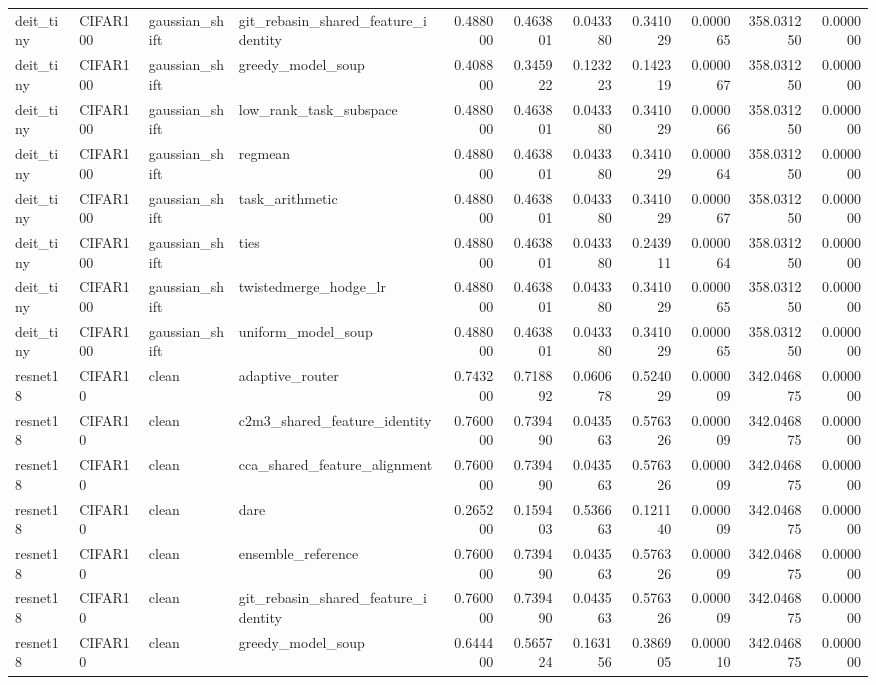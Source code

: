 \begin{tabular}{llllrrrrrrr}
deit_tiny & CIFAR100 & gaussian_shift & git_rebasin_shared_feature_identity & 0.488000 & 0.463801 & 0.043380 & 0.341029 & 0.000065 & 358.031250 & 0.000000 \\
deit_tiny & CIFAR100 & gaussian_shift & greedy_model_soup & 0.408800 & 0.345922 & 0.123223 & 0.142319 & 0.000067 & 358.031250 & 0.000000 \\
deit_tiny & CIFAR100 & gaussian_shift & low_rank_task_subspace & 0.488000 & 0.463801 & 0.043380 & 0.341029 & 0.000066 & 358.031250 & 0.000000 \\
deit_tiny & CIFAR100 & gaussian_shift & regmean & 0.488000 & 0.463801 & 0.043380 & 0.341029 & 0.000064 & 358.031250 & 0.000000 \\
deit_tiny & CIFAR100 & gaussian_shift & task_arithmetic & 0.488000 & 0.463801 & 0.043380 & 0.341029 & 0.000067 & 358.031250 & 0.000000 \\
deit_tiny & CIFAR100 & gaussian_shift & ties & 0.488000 & 0.463801 & 0.043380 & 0.243911 & 0.000064 & 358.031250 & 0.000000 \\
deit_tiny & CIFAR100 & gaussian_shift & twistedmerge_hodge_lr & 0.488000 & 0.463801 & 0.043380 & 0.341029 & 0.000065 & 358.031250 & 0.000000 \\
deit_tiny & CIFAR100 & gaussian_shift & uniform_model_soup & 0.488000 & 0.463801 & 0.043380 & 0.341029 & 0.000065 & 358.031250 & 0.000000 \\
resnet18 & CIFAR10 & clean & adaptive_router & 0.743200 & 0.718892 & 0.060678 & 0.524029 & 0.000009 & 342.046875 & 0.000000 \\
resnet18 & CIFAR10 & clean & c2m3_shared_feature_identity & 0.760000 & 0.739490 & 0.043563 & 0.576326 & 0.000009 & 342.046875 & 0.000000 \\
resnet18 & CIFAR10 & clean & cca_shared_feature_alignment & 0.760000 & 0.739490 & 0.043563 & 0.576326 & 0.000009 & 342.046875 & 0.000000 \\
resnet18 & CIFAR10 & clean & dare & 0.265200 & 0.159403 & 0.536663 & 0.121140 & 0.000009 & 342.046875 & 0.000000 \\
resnet18 & CIFAR10 & clean & ensemble_reference & 0.760000 & 0.739490 & 0.043563 & 0.576326 & 0.000009 & 342.046875 & 0.000000 \\
resnet18 & CIFAR10 & clean & git_rebasin_shared_feature_identity & 0.760000 & 0.739490 & 0.043563 & 0.576326 & 0.000009 & 342.046875 & 0.000000 \\
resnet18 & CIFAR10 & clean & greedy_model_soup & 0.644400 & 0.565724 & 0.163156 & 0.386905 & 0.000010 & 342.046875 & 0.000000 \\

\end{tabular}
